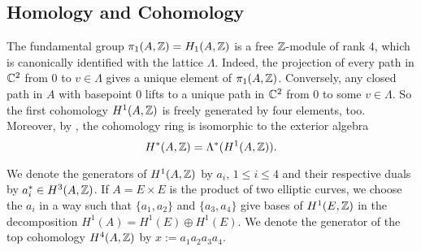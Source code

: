\subsection{Homology and Cohomology}
The fundamental group $\pi_1(A,\mathbb{Z}) = H_1(A,\mathbb{Z})$ is a free $\mathbb{Z}$-module of rank $4$, which is canonically identified with the lattice $\Lambda$. Indeed, the projection of every path in $\mathbb{C}^2$ from $0$ to $v\in \Lambda$ gives a unique element of $\pi_1(A,\mathbb{Z})$. Conversely, any closed path in $A$ with basepoint $0$ lifts to a unique path in $\mathbb{C}^2$ from $0$ to some $v\in\Lambda$.
So the first cohomology $H^1(A,\mathbb{Z})$ is freely generated by four elements, too. Moreover, by \cite[Sect.~I.1]{Mumford}, the cohomology ring is isomorphic to the exterior algebra
$$
H^*(A,\mathbb{Z}) = \Lambda^*(H^1(A,\mathbb{Z})).
$$
\begin{notation} \label{TorusClasses}
We denote the generators of $H^1(A,\mathbb{Z})$ by $a_i$, $1\leq i\leq 4$ and their respective duals by $a_i^*\in H^3(A,\mathbb{Z})$. 
If $A=E\times E$ is the product of two elliptic curves, we choose the $a_i$ in a way such that $\{a_1,a_2\}$ and $\{a_3,a_4\}$ give bases of $H^1(E,\mathbb{Z})$ in the decomposition $H^1(A) = H^1(E)\oplus H^1(E)$.
We denote the generator of the top cohomology $H^4(A,\mathbb{Z})$ by $x := a_1 a_2 a_3 a_4$.
\end{notation}



